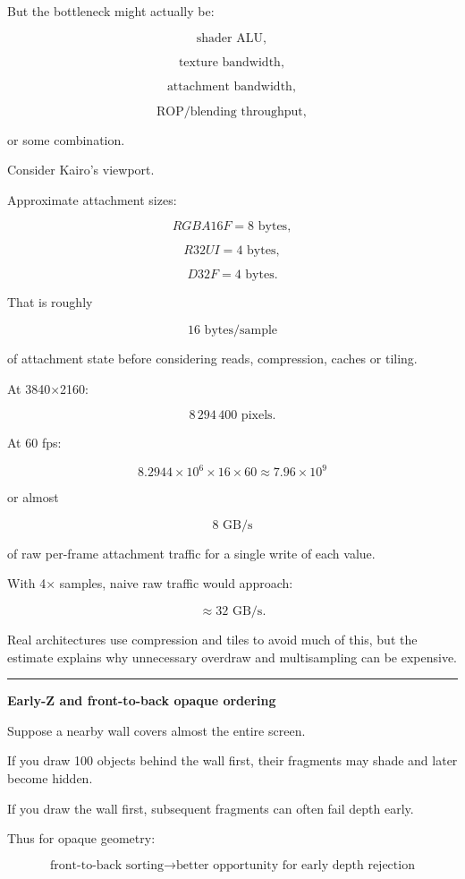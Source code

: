 But the bottleneck might actually be:

\[
\text{shader ALU},
\]

\[
\text{texture bandwidth},
\]

\[
\text{attachment bandwidth},
\]

\[
\text{ROP/blending throughput},
\]

or some combination.

Consider Kairo's viewport.

Approximate attachment sizes:

\[
RGBA16F = 8\text{ bytes},
\]

\[
R32UI = 4\text{ bytes},
\]

\[
D32F = 4\text{ bytes}.
\]

That is roughly

\[
16\text{ bytes/sample}
\]

of attachment state before considering reads, compression, caches or tiling.

At 3840×2160:

\[
8\,294\,400\text{ pixels}.
\]

At 60 fps:

\[
8.2944\times10^6
\times16
\times60
\approx7.96\times10^9
\]

or almost

\[
\boxed{8\text{ GB/s}}
\]

of raw per-frame attachment traffic for a single write of each value.

With 4× samples, naive raw traffic would approach:

\[
\approx32\text{ GB/s}.
\]

Real architectures use compression and tiles to avoid much of this, but the estimate explains why unnecessary overdraw and multisampling can be expensive.

\begin{center}\rule{0.5\linewidth}{0.5pt}\end{center}

\textbf{Early-Z and front-to-back opaque ordering}

Suppose a nearby wall covers almost the entire screen.

If you draw 100 objects behind the wall first, their fragments may shade and later become hidden.

If you draw the wall first, subsequent fragments can often fail depth early.

Thus for opaque geometry:

\[
\boxed{
\text{front-to-back sorting}
\rightarrow
\text{better opportunity for early depth rejection}
}
\]

